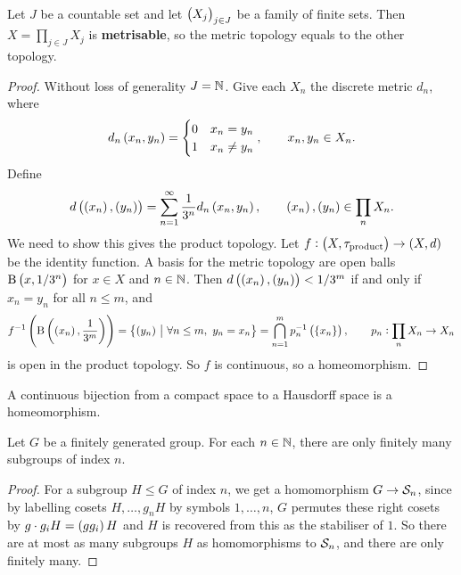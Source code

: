 \begin{proposition}
Let $ J $ be a countable set and let $ \br{X_j}_{j \in J} $ be a family of finite sets. Then $ X = \prod_{j \in J} X_j $ is \textbf{metrisable}, so the metric topology equals to the other topology.
\end{proposition}

\begin{proof}
Without loss of generality $ J = \mathbb{N} $. Give each $ X_n $ the discrete metric $ d_n $, where
$$ d_n\br{x_n, y_n} =
\begin{cases}
0 & x_n = y_n \\
1 & x_n \ne y_n
\end{cases},
\qquad x_n, y_n \in X_n. $$
Define
$$ d\br{\br{x_n}, \br{y_n}} = \sum_{n = 1}^\infty \dfrac{1}{3^n}d_n\br{x_n, y_n}, \qquad \br{x_n}, \br{y_n} \in \prod_n X_n. $$
We need to show this gives the product topology. Let $ f : \br{X, \tau_{\text{product}}} \to \br{X, d} $ be the identity function. A basis for the metric topology are open balls $ \B\br{x, 1 / 3^n} $ for $ x \in X $ and $ n \in \mathbb{N} $. Then $ d\br{\br{x_n}, \br{y_n}} < 1 / 3^m $ if and only if $ x_n = y_n $ for all $ n \le m $, and
$$ f^{-1}\br{\B\br{\br{x_n}, \dfrac{1}{3^m}}} = \cbr{\br{y_n} \st \forall n \le m, \ y_n = x_n} = \bigcap_{n = 1}^m p_n^{-1}\br{\cbr{x_n}}, \qquad p_n : \prod_n X_n \to X_n $$
is open in the product topology. So $ f $ is continuous, so a homeomorphism.
\end{proof}

\begin{proposition}
A continuous bijection from a compact space to a Hausdorff space is a homeomorphism.
\end{proposition}

\begin{lemma}
\label{lem:1.2.18}
Let $ G $ be a finitely generated group. For each $ n \in \mathbb{N} $, there are only finitely many subgroups of index $ n $.
\end{lemma}

\begin{proof}
For a subgroup $ H \le G $ of index $ n $, we get a homomorphism $ G \to \mathcal{S}_n $, since by labelling cosets $ H, \dots, g_nH $ by symbols $ 1, \dots, n $, $ G $ permutes these right cosets by $ g \cdot g_iH = \br{gg_i}H $ and $ H $ is recovered from this as the stabiliser of $ 1 $. So there are at most as many subgroups $ H $ as homomorphisms to $ \mathcal{S}_n $, and there are only finitely many.
\end{proof}

